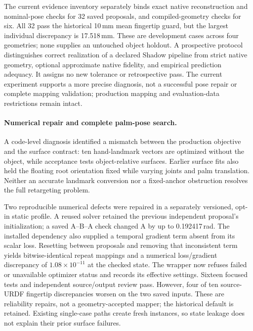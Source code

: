 \documentclass[10pt,letterpaper]{article}
\begin{document}
The current evidence inventory separately binds exact native reconstruction and
nominal-pose checks for 32 saved proposals, and compiled-geometry checks for six.
All 32 pass the historical 10\,mm mean fingertip guard, but the largest individual
discrepancy is 17.518\,mm. These are development cases across four geometries;
none supplies an untouched object holdout. A prospective protocol distinguishes
correct realization of a declared Shadow pipeline from strict native geometry,
optional approximate native fidelity, and empirical prediction adequacy. It
assigns no new tolerance or retrospective pass. The current experiment supports
a more precise diagnosis, not a successful pose repair or complete mapping
validation; production mapping and evaluation-data restrictions remain intact.

\paragraph{Numerical repair and complete palm-pose search.}
A code-level diagnosis identified a mismatch between the production objective
and the surface contract: ten hand-landmark vectors are optimized without the
object, while acceptance tests object-relative surfaces. Earlier surface fits
also held the floating root orientation fixed while varying joints and palm
translation. Neither an accurate landmark conversion nor a fixed-anchor
obstruction resolves the full retargeting problem.

Two reproducible numerical defects were repaired in a separately versioned,
opt-in static profile. A reused solver retained the previous independent
proposal's initialization; a saved A--B--A check changed A by up to
0.192417\,rad. The installed dependency also supplied a temporal gradient term
absent from its scalar loss. Resetting between proposals and removing that
inconsistent term yields bitwise-identical repeat mappings and a numerical
loss/gradient discrepancy of $1.08\times10^{-11}$ at the checked state.
The wrapper now refuses failed or unavailable optimizer status and records its
effective settings. Sixteen focused tests and independent source/output review
pass. However, four of ten source-URDF fingertip discrepancies worsen on the two
saved inputs. These are reliability repairs, not a geometry-accepted mapper;
the historical default is retained. Existing single-case paths create fresh
instances, so state leakage does not explain their prior surface failures.
\end{document}
